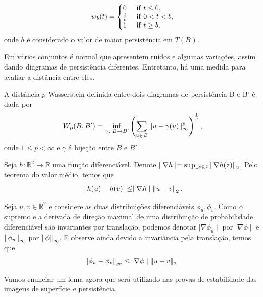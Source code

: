 \begin{equation}\label{eq:weightfunct}
    w_b(t) = \left\{
             \begin{array}{@{}ll@{}} 
                 0           & \text{ if } t \leq 0, \\
                 \frac{t}{b} & \text{ if } 0 < t < b, \\
                 1           & \text{ if } t \geq b, 
             \end{array}\right.
\end{equation}
onde $b$ é considerado o valor de maior persistência em $T(B)$.

Em vários conjuntos é normal que apresentem ruídos e algumas variações, assim dando diagramas de persistência
diferentes. Entretanto, há uma medida para avaliar a distância entre eles. 
\begin{defi}
    A distância $p$-Wasserstein definida entre dois diagramas de persistência B e B' é dada por 
    \begin{equation*}
        W_p(B,B') = \inf_{\gamma\colon B \to B'} \left( \sum_{u\in B} \left\lVert u - \gamma(u)\right\rVert_{\infty}^{p} 
                    \right)^\frac{1}{p},
    \end{equation*}
    onde $1 \leq p < \infty$ e $\gamma$ é bijeção entre $B$ e $B'$. 
\end{defi}

Seja $h\colon \mathbb{R}^2 \to \mathbb{R}$ uma função diferenciável. Denote 
$\mid \nabla h \mid = \sup_{z\in \mathbb{R}^2} \left\lVert\nabla h(z)\right\rVert_2$. Pelo teorema do valor médio, temos que 
\begin{equation}\label{eq:mean_val}
    \mid h(u) - h(v) \mid \leq \mid \nabla h \mid \left\lVert u-v\right\rVert_2.
\end{equation}

Seja $u,v\in \mathbb{R}^2$ e considere as duas distribuições diferenciáveis $\phi_u, \phi_v$. Como o supremo e 
a derivada de direção maximal de uma distribuição de probabilidade diferenciável são invariantes por translação,
podemos denotar $\mid \nabla \phi_u \mid$ por $\mid \nabla \phi \mid$ e $\left\lVert\phi_u\right\rVert_\infty$ por
$\left\lVert\phi\right\rVert_\infty$. E observe ainda devido a invariância pela translação, temos que 
\begin{equation}\label{eq:mean_val_dist}
    \left\lVert\phi_u - \phi_v\right\rVert_\infty \leq \mid \nabla \phi \mid \left\lVert u-v\right\rVert_2.
\end{equation} 

Vamos enunciar um lema agora que será utilizado nas provas de estabilidade das imagens de superfície e persistência.

